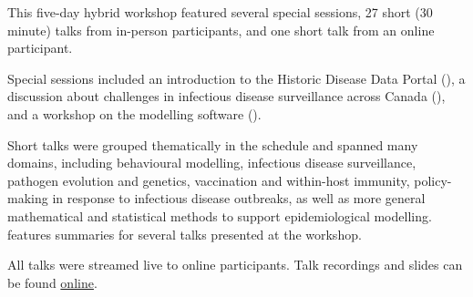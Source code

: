 This five-day hybrid workshop featured several special sessions, 27 short (30 minute) talks from in-person participants, and one short talk from an online participant. 

Special sessions included an introduction to the Historic Disease Data Portal (), a discussion about challenges in infectious disease surveillance across Canada (), and a workshop on the \macpan modelling software ().

Short talks were grouped thematically in the schedule and spanned many domains, including behavioural modelling, infectious disease surveillance, pathogen evolution and genetics, vaccination and within-host immunity, policy-making in response to infectious disease outbreaks, as well as more general mathematical and statistical methods to support epidemiological modelling.  features summaries for several talks presented at the workshop. 

All talks were streamed live to online participants. Talk recordings and slides can be found \href{https://www.birs.ca/events/2023/5-day-workshops/23w5151}{online}. 